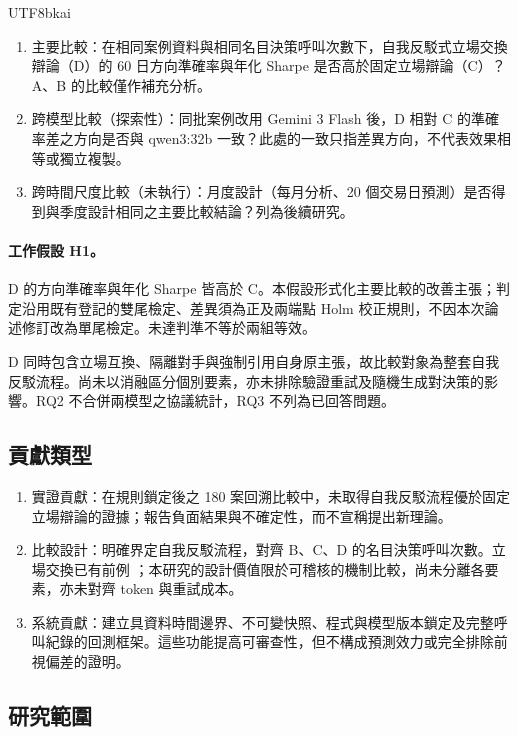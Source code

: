 \documentclass[12pt,a4paper]{article}
\newcommand{\grp}[1]{\textsf{#1}}
\begin{document}
\begin{CJK}{UTF8}{bkai}
\begin{enumerate}[label=RQ\arabic*：,leftmargin=4em]
  \item 主要比較：在相同案例資料與相同名目決策呼叫次數下，自我反駁式立場交換辯論（\grp{D}）的 60 日方向準確率與年化 Sharpe 是否高於固定立場辯論（\grp{C}）？\grp{A}、\grp{B} 的比較僅作補充分析。
  \item 跨模型比較（探索性）：同批案例改用 Gemini 3 Flash 後，\grp{D} 相對 \grp{C} 的準確率差之方向是否與 qwen3:32b 一致？此處的一致只指差異方向，不代表效果相等或獨立複製。
  \item 跨時間尺度比較（未執行）：月度設計（每月分析、20 個交易日預測）是否得到與季度設計相同之主要比較結論？列為後續研究。
\end{enumerate}

\paragraph{工作假設 H1。} \grp{D} 的方向準確率與年化 Sharpe 皆高於 \grp{C}。本假設形式化主要比較的改善主張；判定沿用既有登記的雙尾檢定、差異須為正及兩端點 Holm 校正規則，不因本次論述修訂改為單尾檢定。未達判準不等於兩組等效。

\noindent \grp{D} 同時包含立場互換、隔離對手與強制引用自身原主張，故比較對象為整套自我反駁流程。尚未以消融區分個別要素，亦未排除驗證重試及隨機生成對決策的影響。RQ2 不合併兩模型之協議統計，RQ3 不列為已回答問題。

\subsection{貢獻類型}

\begin{enumerate}[label=\arabic*.]
  \item 實證貢獻：在規則鎖定後之 180 案回溯比較中，未取得自我反駁流程優於固定立場辯論的證據；報告負面結果與不確定性，而不宣稱提出新理論。
  \item 比較設計：明確界定自我反駁流程，對齊 \grp{B}、\grp{C}、\grp{D} 的名目決策呼叫次數。立場交換已有前例 \citep{liu2025roleswitch,chowdhury2026proclaim}；本研究的設計價值限於可稽核的機制比較，尚未分離各要素，亦未對齊 token 與重試成本。
  \item 系統貢獻：建立具資料時間邊界、不可變快照、程式與模型版本鎖定及完整呼叫紀錄的回測框架。這些功能提高可審查性，但不構成預測效力或完全排除前視偏差的證明。
\end{enumerate}

\subsection{研究範圍}


\end{CJK}
\end{document}
